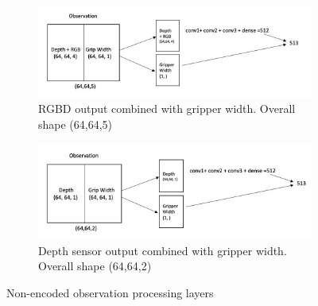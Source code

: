 \begin{figure}
    \centering
    \begin{subfigure}{1\textwidth}
      \includegraphics[width=1\linewidth]{figures/RGBDobs}
      \caption{RGBD output combined with gripper width. Overall shape (64,64,5)} \label{fig:rgbobs}
    \end{subfigure}%
    \newline
    \begin{subfigure}{1\textwidth}
      \includegraphics[width=1\linewidth]{figures/depthobs}
      \caption{Depth sensor output combined with gripper width. Overall shape (64,64,2)} \label{fig:depthobs}
    \end{subfigure}%


\caption{ Non-encoded observation processing layers \label{fig:obsprocess}}
\end{figure}